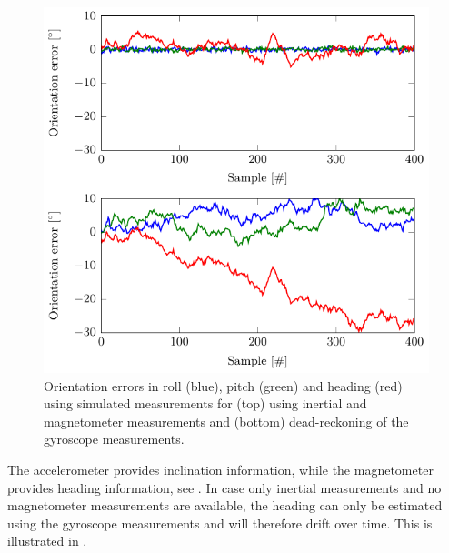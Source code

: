 \begin{figure}[t]
	\centering
	\includegraphics[scale = 1]{figure4_5.pdf}
    	\caption{Orientation errors in roll (blue), pitch (green) and heading (red) using simulated measurements for (top)  using inertial and magnetometer measurements and (bottom) dead-reckoning of the gyroscope measurements.}
	\label{fig:oriEst-simOriErrors}
\end{figure}

The accelerometer provides inclination information, while the magnetometer provides heading information, see . In case only inertial measurements and no magnetometer measurements are available, the heading can only be estimated using the gyroscope measurements and will therefore drift over time. This is illustrated in .

